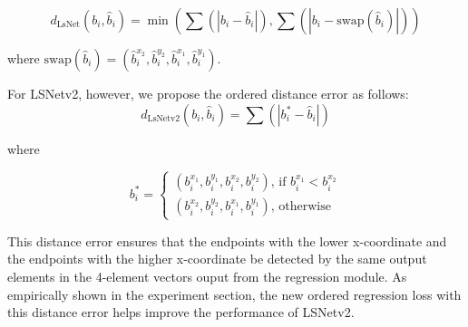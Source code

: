 \documentclass[journal]{IEEEtran}
\newcommand{\commentM}[1]{\textbf{\textcolor{blue}{M: #1}}}
\begin{document}
\begin{equation}
  d_{\text{LsNet}}(b_i, \hat{b}_i) = \min(\sum (|b_i - \hat{b}_i|), \sum(|b_i - \text{swap}(\hat{b}_i)|))
\end{equation}

where $\text{swap}(\hat{b}_i) = (\hat{b}_i^{x_2}, \hat{b}_i^{y_2}, \hat{b}_i^{x_1}, \hat{b}_i^{y_1})$.

For LSNetv2, however, we propose the ordered distance error as follows:
\begin{equation}
  d_{\text{LsNetv2}}(b_i, \hat{b}_i) = \sum (|b^*_i - \hat{b}_i|)
\end{equation}

where 

\begin{equation}
  b^*_i=
    \begin{cases}
       (b_i^{x_1}, b_i^{y_1}, b_i^{x_2}, b_i^{y_2}) \text{, if } b_i^{x_1} < b_i^{x_2} \\
       (b_i^{x_2}, b_i^{y_2}, b_i^{x_1}, b_i^{y_1}) \text{, otherwise }
    \end{cases}       
\end{equation}

This distance error ensures that the endpoints with the lower x-coordinate and the endpoints with the higher x-coordinate be detected by the same output elements in the 4-element vectors ouput from the regression module. As empirically shown in the experiment section, the new ordered regression loss with this distance error helps improve the performance of LSNetv2. 




\end{document}

